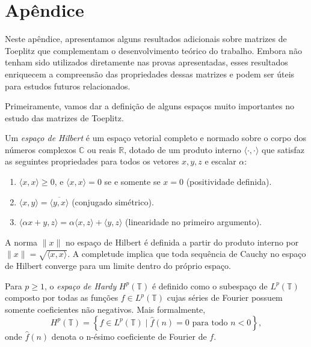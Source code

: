 \section*{Apêndice}
\vspace{1cm}

Neste apêndice, apresentamos alguns resultados adicionais sobre matrizes de Toeplitz que complementam o desenvolvimento teórico do trabalho. Embora não tenham sido utilizados diretamente nas provas apresentadas, esses resultados enriquecem a compreensão das propriedades dessas matrizes e podem ser úteis para estudos futuros relacionados.

Primeiramente, vamos dar a definição de alguns espaços muito importantes no estudo das matrizes de Toeplitz.

\begin{definition*}
  Um \textit{espaço de Hilbert} é um espaço vetorial completo e normado sobre o corpo dos números complexos $\mathbb{C}$ ou reais $\mathbb{R}$, dotado de um produto interno $\langle \cdot , \cdot \rangle$ que satisfaz as seguintes propriedades para todos os vetores $x, y, z$ e escalar $\alpha$:
  \begin{enumerate}
    \item $\langle x, x \rangle \geq 0$, e $\langle x, x \rangle = 0$ se e somente se $x = 0$ (positividade definida).
    \item $\langle x, y \rangle = \overline{\langle y, x \rangle}$ (conjugado simétrico).
    \item $\langle \alpha x + y, z \rangle = \alpha \langle x, z \rangle + \langle y, z \rangle$ (linearidade no primeiro argumento).
  \end{enumerate}
\end{definition*}

A norma $\|x\|$ no espaço de Hilbert é definida a partir do produto interno por $\|x\| = \sqrt{\langle x, x \rangle}$. A completude implica que toda sequência de Cauchy no espaço de Hilbert converge para um limite dentro do próprio espaço.

\begin{definition*}
  Para $p \geq 1$, o \textit{espaço de Hardy} $H^p(\mathbb{T})$ é definido como o subespaço de $L^p(\mathbb{T})$ composto por todas as funções $f \in L^p(\mathbb{T})$ cujas séries de Fourier possuem somente coeficientes não negativos. Mais formalmente,
  \[
    H^p(\mathbb{T}) = \left\{ f \in L^p(\mathbb{T}) \; \bigg| \; \hat{f}(n) = 0 \text{ para todo } n < 0 \right\},
  \]
  onde $\hat{f}(n)$ denota o n-ésimo coeficiente de Fourier de $f$.
\end{definition*}

